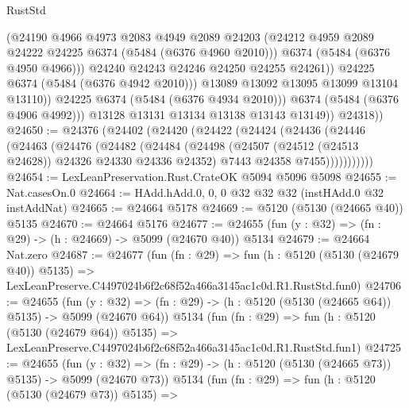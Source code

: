 \begin{lexlean}{RustStd}
\begin{coremodule}
                          (@24190
                            @4966
                            @4973
                            @2083
                            @4949
                            @2089
                            @24203
                            (@24212 @4959 @2089 @24222 @24225 @6374 (@5484 (@6376 @4960 @2010)))
                            @6374
                            (@5484 (@6376 @4950 @4966)))
                          @24240
                          @24243
                          @24246
                          @24250
                          @24255
                          @24261))
                      @24225
                      @6374
                      (@5484 (@6376 @4942 @2010)))
                    @13089
                    @13092
                    @13095
                    @13099
                    @13104
                    @13110))
                @24225
                @6374
                (@5484 (@6376 @4934 @2010)))
              @6374
              (@5484 (@6376 @4906 @4992)))
            @13128
            @13131
            @13134
            @13138
            @13143
            @13149))
        @24318))
@24650 := @24376
    (@24402
      (@24420
        (@24422
          (@24424
            (@24436
              (@24446
                (@24463
                  (@24476
                    (@24482
                      (@24484
                        (@24498
                          (@24507 (@24512 (@24513 @24628)) @24326 @24330 @24336 @24352)
                          @7443
                          @24358
                          @7455)))))))))))
@24654 := LexLeanPreservation.Rust.CrateOK @5094 @5096 @5098
@24655 := Nat.casesOn.{0}
@24664 := HAdd.hAdd.{0, 0, 0} @32 @32 @32 (instHAdd.{0} @32 instAddNat)
@24665 := @24664 @5178
@24669 := @5120 (@5130 (@24665 @40)) @5135
@24670 := @24664 @5176
@24677 := @24655 (fun (y : @32) => (fn : @29) -> (h : @24669) -> @5099 (@24670 @40)) @5134
@24679 := @24664 Nat.zero
@24687 := @24677
    (fun (fn : @29) =>
    fun (h : @5120 (@5130 (@24679 @40)) @5135) =>
    LexLeanPreserve.C4497024b6f2c68f52a466a3145ac1c0d.R1.RustStd.fun0)
@24706 := @24655
    (fun (y : @32) => (fn : @29) -> (h : @5120 (@5130 (@24665 @64)) @5135) -> @5099 (@24670 @64))
    @5134
    (fun (fn : @29) =>
    fun (h : @5120 (@5130 (@24679 @64)) @5135) =>
    LexLeanPreserve.C4497024b6f2c68f52a466a3145ac1c0d.R1.RustStd.fun1)
@24725 := @24655
    (fun (y : @32) => (fn : @29) -> (h : @5120 (@5130 (@24665 @73)) @5135) -> @5099 (@24670 @73))
    @5134
    (fun (fn : @29) =>
    fun (h : @5120 (@5130 (@24679 @73)) @5135) =>

\end{coremodule}
\end{lexlean}
